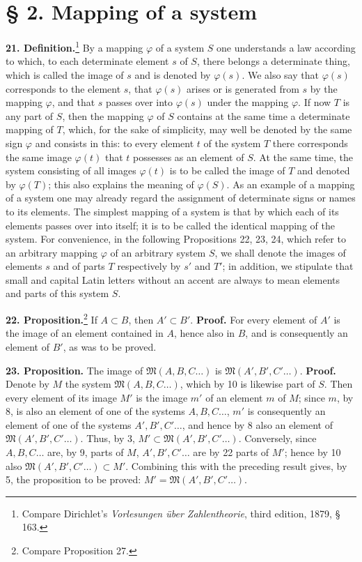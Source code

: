 \documentclass[11pt]{article}
\newcommand{\Mf}{\mathfrak{M}}
\newcommand{\partof}{\mathrel{\subset}}
\begin{document}
\section*{§ 2. Mapping of a system}

\noindent\textbf{21. Definition.}\footnote{Compare Dirichlet's \emph{Vorlesungen über Zahlentheorie}, third edition, 1879, § 163.} By a mapping $\varphi$ of a system $S$ one understands a law according to which, to each determinate element $s$ of $S$, there belongs a determinate thing, which is called the image of $s$ and is denoted by $\varphi(s)$. We also say that $\varphi(s)$ corresponds to the element $s$, that $\varphi(s)$ arises or is generated from $s$ by the mapping $\varphi$, and that $s$ passes over into $\varphi(s)$ under the mapping $\varphi$. If now $T$ is any part of $S$, then the mapping $\varphi$ of $S$ contains at the same time a determinate mapping of $T$, which, for the sake of simplicity, may well be denoted by the same sign $\varphi$ and consists in this: to every element $t$ of the system $T$ there corresponds the same image $\varphi(t)$ that $t$ possesses as an element of $S$. At the same time, the system consisting of all images $\varphi(t)$ is to be called the image of $T$ and denoted by $\varphi(T)$; this also explains the meaning of $\varphi(S)$. As an example of a mapping of a system one may already regard the assignment of determinate signs or names to its elements. The simplest mapping of a system is that by which each of its elements passes over into itself; it is to be called the identical mapping of the system. For convenience, in the following Propositions 22, 23, 24, which refer to an arbitrary mapping $\varphi$ of an arbitrary system $S$, we shall denote the images of elements $s$ and of parts $T$ respectively by $s'$ and $T'$; in addition, we stipulate that small and capital Latin letters without an accent are always to mean elements and parts of this system $S$.

\noindent\textbf{22. Proposition.}\footnote{Compare Proposition 27.} If $A\partof B$, then $A'\partof B'$. \textbf{Proof.} For every element of $A'$ is the image of an element contained in $A$, hence also in $B$, and is consequently an element of $B'$, as was to be proved.

\noindent\textbf{23. Proposition.} The image of $\Mf(A,B,C\ldots)$ is $\Mf(A',B',C'\ldots)$. \textbf{Proof.} Denote by $M$ the system $\Mf(A,B,C\ldots)$, which by 10 is likewise part of $S$. Then every element of its image $M'$ is the image $m'$ of an element $m$ of $M$; since $m$, by 8, is also an element of one of the systems $A,B,C\ldots$, $m'$ is consequently an element of one of the systems $A',B',C'\ldots$, and hence by 8 also an element of $\Mf(A',B',C'\ldots)$. Thus, by 3, $M'\partof\Mf(A',B',C'\ldots)$. Conversely, since $A,B,C\ldots$ are, by 9, parts of $M$, $A',B',C'\ldots$ are by 22 parts of $M'$; hence by 10 also $\Mf(A',B',C'\ldots)\partof M'$. Combining this with the preceding result gives, by 5, the proposition to be proved: $M'=\Mf(A',B',C'\ldots)$.
\end{document}
